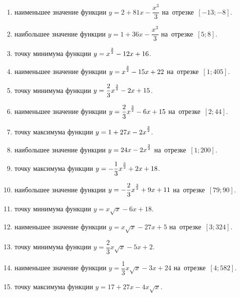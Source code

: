 \documentclass[a4paper,10pt]{article}
\begin{document}
\begin{enumerate}
\item {} наименьшее значение функции $y=2 +81x-\dfrac{x^3}{3}$ на~отрезке~$\left[-13;-8\right]$.

\item {} наибольшее значение функции $y=1 +36x-\dfrac{x^3}{3}$ на~отрезке~$\left[5;8\right]$.

\item {} точку минимума функции $y=x\strut^{\frac{3}{2}} -12x+16$.

\item {} наименьшее значение функции $y=x\strut^{\frac{3}{2}} -15x+22$ на~отрезке~$\left[1;405\right]$.

\item {} точку минимума функции $y=\dfrac{2}{3}x\strut^{\frac{3}{2}} -2x+15$.

\item {} наименьшее значение функции $y=\dfrac{2}{3}x\strut^{\frac{3}{2}} -6x+15$ на~отрезке~$\left[2;44\right]$.

\item {} точку максимума функции $y=1+27x-2x\strut^{\frac{3}{2}}$.

\item {} наибольшее значение функции $y=24x-2x\strut^{\frac{3}{2}}$ на~отрезке~$\left[1;200\right]$.

\item {} точку максимума функции $y=-\dfrac{1}{3}x\strut^{\frac{3}{2}} +2x+18$.

\item {} наибольшее значение функции $y=-\dfrac{2}{3}x\strut^{\frac{3}{2}} +9x+11$ на~отрезке~$\left[79;90\right]$.

\item {} точку минимума функции $y=x\sqrt{x} -6x+18$.

\item {} наименьшее значение функции $y=x\sqrt{x} -27x+5$ на~отрезке~$\left[3;324\right]$.

\item {} точку минимума функции $y=\dfrac{2}{3}x\sqrt{x} -5x+2$.

\item {} наименьшее значение функции $y=\dfrac{1}{3}x\sqrt{x} -3x+24$ на~отрезке~$\left[4;582\right]$.

\item {} точку максимума функции $y=17+27x -4x\sqrt{x}$.


\end{enumerate}
\end{document}
